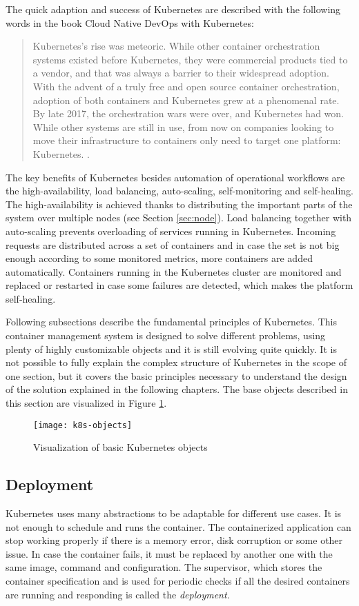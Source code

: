 \documentclass[
  digital, %
  twoside, %
  table,   %
  lof,     %
  lot,     %
]{fithesis3}
\begin{document}
The quick adaption and success of Kubernetes are described with the following words in the book Cloud Native DevOps with Kubernetes:
\begin{quote}
Kubernetes’s rise was meteoric. While other container orchestration systems existed
before Kubernetes, they were commercial products tied to a vendor, and that was
always a barrier to their widespread adoption. With the advent of a truly free and
open source container orchestration, adoption of both containers and Kubernetes grew
at a phenomenal rate.
By late 2017, the orchestration wars were over, and Kubernetes had won. While other
systems are still in use, from now on companies looking to move their infrastructure
to containers only need to target one platform: Kubernetes. \cite[p. 11]{k8s}.
\end{quote}

The key benefits of Kubernetes \cite{k8s_features} besides automation of operational workflows are the high-availability, load balancing, auto-scaling, self-monitoring and self-healing. The high-availability is achieved thanks to distributing the important parts of the system over multiple nodes (see Section \ref{sec:node}). Load balancing together with auto-scaling prevents overloading of services running in Kubernetes. Incoming requests are distributed across a set of containers and in case the set is not big enough according to some monitored metrics, more containers are added automatically. Containers running in the Kubernetes cluster are monitored and replaced or restarted in case some failures are detected, which makes the platform self-healing.

Following subsections describe the fundamental principles of Kubernetes. This container management system is designed to solve different problems, using plenty of highly customizable objects and it is still evolving quite quickly. It is not possible to fully explain the complex structure of Kubernetes in the scope of one section, but it covers the basic principles necessary to understand the design of the solution explained in the following chapters. The base objects described in this section are visualized in Figure \ref{fig:k8s_objects}.


\begin{figure}[H]
\caption{Visualization of basic Kubernetes objects}
\centering
\texttt{[image: k8s-objects]}
\label{fig:k8s_objects}
\end{figure}

\subsection{Deployment} \label{sec:deployment}
Kubernetes uses many abstractions to be adaptable for different use cases. It is not enough to schedule and runs the container. The containerized application can stop working properly if there is a memory error, disk corruption or some other issue. In case the container fails, it must be replaced by another one with the same image, command and configuration. The supervisor, which stores the container specification and is used for periodic checks if all the desired containers are running and responding is called the \textit{deployment}.
\end{document}
